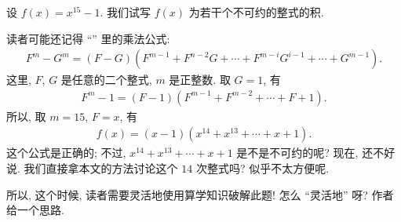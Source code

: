 \begin{example}
    设 $f(x) = x^{15}-1$. 我们试写 $f(x)$ 为若干个不可约的整式的积.

    读者可能还记得 ``\SyntheticDivision '' 里的乘法公式:
    \begin{align*}
        F^m - G^m = (F - G)(F^{m-1} + F^{n-2} G + \cdots + F^{m-i} G^{i-1} + \cdots + G^{m-1}).
    \end{align*}
    这里, $F$, $G$ 是任意的二个整式, $m$ 是正整数. 取 $G = 1$, 有
    \begin{align*}
        F^m - 1 = (F - 1)(F^{m-1} + F^{m-2} + \cdots + F + 1). \tag*{(D)}
    \end{align*}
    所以, 取 $m = 15$, $F = x$, 有
    \begin{align*}
        f(x) = (x - 1)(x^{14} + x^{13} + \cdots + x + 1).
    \end{align*}
    这个公式是正确的; 不过, $x^{14} + x^{13} + \cdots + x + 1$ 是不是不可约的呢? 现在, 还不好说. 我们直接拿本文的方法讨论这个 $14$ 次整式吗? 似乎不太方便呢.

    所以, 这个时候, 读者需要灵活地使用算学知识破解此题! 怎么 ``灵活地'' 呀? 作者给一个思路.


\end{example}
